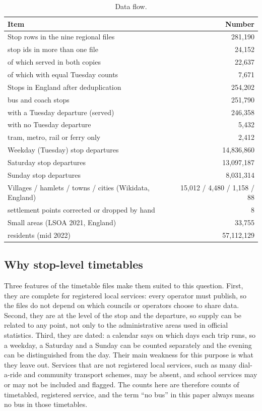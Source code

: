 \documentclass[11pt,a4paper]{article}
\begin{document}
\begin{table}[tbp]\centering\small\caption{Data flow.}\label{tab:sample}\begin{tabular}{lr}\toprule Item & Number\\\midrule
Stop rows in the nine regional files & 281,190\\
\quad stop ids in more than one file & 24,152\\
\quad of which served in both copies & 22,637\\
\quad of which with equal Tuesday counts & 7,671\\
Stops in England after deduplication & 254,202\\
\quad bus and coach stops & 251,790\\
\quad with a Tuesday departure (served) & 246,358\\
\quad with no Tuesday departure & 5,432\\
\quad tram, metro, rail or ferry only & 2,412\\\midrule
Weekday (Tuesday) stop departures & 14,836,860\\
Saturday stop departures & 13,097,187\\
Sunday stop departures & 8,031,314\\\midrule
Villages / hamlets / towns / cities (Wikidata, England) & 15,012 / 4,480 / 1,158 / 88\\
\quad settlement points corrected or dropped by hand & 8\\
Small areas (LSOA 2021, England) & 33,755\\
\quad residents (mid 2022) & 57,112,129\\\bottomrule\end{tabular}\end{table}

\subsection{Why stop-level timetables}
Three features of the timetable files make them suited to this question. First, they are complete for registered local services: every operator must publish, so the files do not depend on which councils or operators choose to share data. Second, they are at the level of the stop and the departure, so supply can be related to any point, not only to the administrative areas used in official statistics. Third, they are dated: a calendar says on which days each trip runs, so a weekday, a Saturday and a Sunday can be counted separately and the evening can be distinguished from the day. Their main weakness for this purpose is what they leave out. Services that are not registered local services, such as many dial-a-ride and community transport schemes, may be absent, and school services may or may not be included and flagged. The counts here are therefore counts of timetabled, registered service, and the term ``no bus'' in this paper always means no bus in those timetables.
\end{document}
